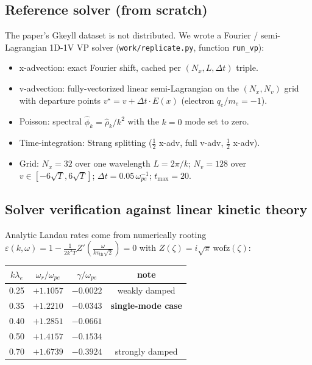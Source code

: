 \documentclass[11pt]{article}
\begin{document}
\subsection{Reference solver (from scratch)}
The paper's Gkeyll dataset is not distributed. We wrote a Fourier / semi-Lagrangian
1D-1V VP solver (\texttt{work/replicate.py}, function \texttt{run\_vp}):
\begin{itemize}
    \item x-advection: exact Fourier shift, cached per $(N_x, L, \Delta t)$ triple.
    \item v-advection: fully-vectorized linear semi-Lagrangian on the $(N_x, N_v)$ grid
    with departure points $v^\star = v + \Delta t \cdot E(x)$ (electron $q_e/m_e = -1$).
    \item Poisson: spectral $\hat\phi_k = \hat\rho_k / k^2$ with the $k = 0$ mode set to zero.
    \item Time-integration: Strang splitting ($\tfrac{1}{2}$ x-adv, full v-adv, $\tfrac{1}{2}$ x-adv).
    \item Grid: $N_x = 32$ over one wavelength $L = 2\pi / k$; $N_v = 128$ over $v \in [-6\sqrt{T}, 6\sqrt{T}]$;
    $\Delta t = 0.05\,\omega_{pe}^{-1}$; $t_{\max} = 20$.
\end{itemize}

\subsection{Solver verification against linear kinetic theory}
Analytic Landau rates come from numerically rooting
$\varepsilon(k, \omega) = 1 - \frac{1}{2k^2 T} Z'\!\left(\frac{\omega}{k v_{\text{th}}\sqrt{2}}\right) = 0$
with $Z(\zeta) = i\sqrt{\pi}\,\mathrm{wofz}(\zeta)$:
\begin{center}
\begin{tabular}{cccc}
\toprule
$k\lambda_e$ & $\omega_r/\omega_{pe}$ & $\gamma/\omega_{pe}$ & note \\
\midrule
0.25 & $+1.1057$ & $-0.0022$ & weakly damped \\
$\mathbf{0.35}$ & $\mathbf{+1.2210}$ & $\mathbf{-0.0343}$ & \textbf{single-mode case} \\
0.40 & $+1.2851$ & $-0.0661$ & \\
0.50 & $+1.4157$ & $-0.1534$ & \\
0.70 & $+1.6739$ & $-0.3924$ & strongly damped \\
\bottomrule
\end{tabular}
\end{center}
\end{document}
